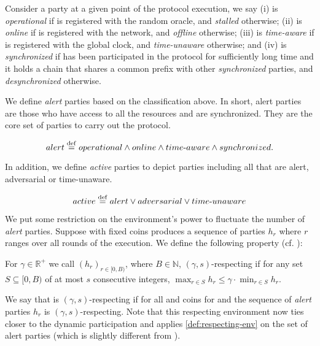 Consider a party \party at a given point of the protocol execution, we say
%
(i) \party is \emph{operational} if \party is registered with the random oracle, and \emph{stalled} otherwise;
%
(ii) \party is \emph{online} if \party is registered with the network, and \emph{offline} otherwise;
%
(iii) \party is \emph{time-aware} if \party is registered with the global clock, and \emph{time-unaware} otherwise;
%
and (iv) \party is \emph{synchronized} if \party has been participated in the protocol for sufficiently long time and it holds a chain that shares a common prefix with other \emph{synchronized} parties, and \emph{desynchronized} otherwise.

We define \emph{alert} parties based on the classification above.
%
In short, alert parties are those who have access to all the resources and are synchronized. They are the core set of parties to carry out the protocol.

\begin{equation*}
    alert \overset{\mathrm{def}}{=} operational \wedge online \wedge time\text{-}aware \wedge synchronized.
\end{equation*}

In addition, we define \emph{active} parties to depict parties including all that are alert, adversarial or time-unaware.

\begin{equation*}
    active \overset{\mathrm{def}}{=} alert \vee adversarial \vee time\text{-}unaware
\end{equation*}

We put some restriction on the environment's power to fluctuate the number of \emph{alert} parties.
%
Suppose \Z with fixed coins produces a sequence of parties $h_r$ where $r$ ranges over all rounds of the execution. We define the following property (cf. \cite{EPRINT:GarKiaLeo20}):
%
\begin{definition} \label{def:respecting-env}
    For $\gamma \in \mathbb{R}^+$ we call $(h_r)_{r \in [0, B)}$, where $B \in \mathbb{N}$, $(\gamma, s)$-respecting if for any set $S \subseteq [0, B)$ of at most $s$ consecutive integers, $\max_{r \in S} h_r \le \gamma \cdot \min_{r \in S} h_r$.
\end{definition}

We say that \Z is $(\gamma, s)$-respecting if for all \adv and coins for \Z and \adv the sequence of \emph{alert} parties $h_r$ is $(\gamma, s)$-respecting.
%
Note that this respecting environment now ties closer to the dynamic participation and applies \cref{def:respecting-env} on the set of alert parties (which is slightly different from \cite{C:GarKiaLeo17,EPRINT:GarKiaLeo20}).

